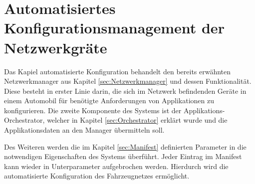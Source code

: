 \chapter{Automatisiertes Konfigurationsmanagement der Netzwerkgräte}\label{sec:Config}
Das Kapiel automatisierte Konfiguration behandelt den bereits erwähnten Netzwerkmanager aus Kapitel \ref{sec:Netzwerkmanager} und dessen Funktionalität. Diese besteht in erster Linie darin, die sich im Netzwerk befindenden Geräte in einem Automobil für benötigte Anforderungen von Applikationen zu konfigurieren. Die zweite Komponente des Systems ist der Applikations-Orchestrator, welcher in Kapitel \ref{sec:Orchestrator} erklärt wurde und die Applikationsdaten an den Manager übermitteln soll.

Des Weiteren werden die im Kapitel \ref{sec:Manifest} definierten Parameter in die notwendigen Eigenschaften des Systems überführt. Jeder Eintrag im Manifest kann wieder in Unterparameter aufgebrochen werden. Hierdurch wird die automatisierte Konfiguration des Fahrzeugnetzes ermöglicht. 



